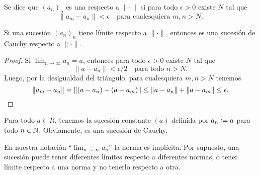 \documentclass{article}
\numberwithin{equation}{section}
\theoremstyle{definition}
\begin{document}
\begin{definicion}
  Se dice que $(a_n)_n$ es una  respecto a $\|\cdot\|$
  si para todo $\epsilon > 0$ existe $N$ tal que
  $$\|a_m - a_n\| < \epsilon\quad\text{para cualesquiera }m,n > N.$$
\end{definicion}

\begin{observacion}
  Si una sucesión $(a_n)_n$ tiene límite respecto a $\|\cdot\|$, entonces es una
  sucesión de Cauchy respecto a $\|\cdot\|$.

  \begin{proof}
    Si $\lim_{n\to\infty} a_n = a$, entonces para todo $\epsilon > 0$ existe $N$
    tal que
    $$\|a - a_n\| < \epsilon/2\quad\text{para todo }n > N.$$
    Luego, por la desigualdad del triángulo, para cualesquiera $m,n > N$ tenemos
    \[ \|a_m - a_n\| = \|(a - a_n) - (a - a_m)\|
       \le \|a - a_n\| + \|a - a_m\| \le \epsilon. \qedhere \]
  \end{proof}
\end{observacion}

\begin{ejemplo}
  Para todo $a\in R$, tenemos la sucesión constante $(a)$ definida por
  $a_n \mathrel{\mathop:}= a$ para todo $n\in\mathbb{N}$. Obviamente, es una sucesión de Cauchy.
\end{ejemplo}

En nuestra notación ``$\lim_{n\to\infty} a_n$'' la norma es implícita.
Por supuesto, una sucesión puede tener diferentes límites respecto a diferentes
normas, o tener límite respecto a una norma y no tenerlo respecto a otra.
\end{document}
